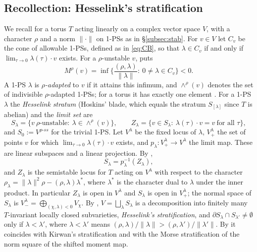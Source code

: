 \documentclass[11pt]{amsart}
\theoremstyle{definition}
\theoremstyle{remark}
\numberwithin{equation}{section}
\newcommand{\norm}[1]{\lVert #1\rVert}
\begin{document}
\subsection{Recollection: Hesselink's stratification}\label{subsec:HKKN}
We recall \cite[\S\S2.2--2.3]{Hos} for a torus $T$ acting linearly on a complex vector space $V$, with a
character $\rho$ and a norm $\norm{\cdot}$ on 1-PSs as in \S\ref{subsec:stab}. For $v\in V$ let $C_v$ be
the cone of allowable 1-PSs, defined as in \eqref{eq:CB}, so that $\lambda\in C_v$ if and only if
$\lim_{\tau\to0}\lambda(\tau)\cdot v$ exists. For a $\rho$-unstable $v$, \cite[Definition~2.12]{Hos}
puts
\[
  M^\rho(v)=\inf\Big\{\frac{(\rho,\lambda)}{\norm{\lambda}}:\ 0\neq\lambda\in C_v\Big\}<0 .
\]
A 1-PS $\lambda$ is \emph{$\rho$-adapted} to $v$ if it attains this infimum, and $\wedge^\rho(v)$ denotes
the set of indivisible $\rho$-adapted 1-PSs; for a torus it has exactly one element
\cite[Lemma~2.13]{Hos}. For a 1-PS $\lambda$ the \emph{Hesselink stratum} (Hoskins' blade, which equals the
stratum $S_{[\lambda]}$ since $T$ is abelian) and the \emph{limit set} are \cite[(5), (6)]{Hos}
\[
  S_\lambda=\{v\ \rho\text{-unstable}:\ \lambda\in\wedge^\rho(v)\},\qquad
  Z_\lambda=\{v\in S_\lambda:\ \lambda(\tau)\cdot v=v\ \text{for all }\tau\},
\]
and $S_0:=V^{\rho\text{-}ss}$ for the trivial 1-PS. Let $V^\lambda$ be the fixed locus of $\lambda$,
$V^\lambda_+$ the set of points $v$ for which $\lim_{\tau\to0}\lambda(\tau)\cdot v$ exists, and
$p_\lambda:V^\lambda_+\to V^\lambda$ the limit map. These are linear subspaces and a linear projection.
By \cite[Proposition~2.18, Lemma~2.19]{Hos},
\[
  S_\lambda=p_\lambda^{-1}(Z_\lambda),
\]
and $Z_\lambda$ is the semistable locus for $T$ acting on $V^\lambda$ with respect to the character
$\rho_\lambda=\norm{\lambda}^2\rho-(\rho,\lambda)\lambda^*$, where $\lambda^*$ is the character dual to
$\lambda$ under the inner product. In particular $Z_\lambda$ is open in $V^\lambda$ and $S_\lambda$ is open
in $V^\lambda_+$; the normal space of $S_\lambda$ is $V^\lambda_-=\bigoplus_{(\chi,\lambda)<0}V_\chi$. By
\cite[Theorem~2.16, Remark~2.17]{Hos}, $V=\bigsqcup_\lambda S_\lambda$ is a decomposition into finitely
many $T$-invariant locally closed subvarieties, \emph{Hesselink's stratification}, and
$\partial S_\lambda\cap S_{\lambda'}\neq\emptyset$ only if $\lambda<\lambda'$, where
$\lambda<\lambda'$ means $(\rho,\lambda)/\norm{\lambda}>(\rho,\lambda')/\norm{\lambda'}$. By
\cite[Theorems~4.12 and~4.18]{Hos} it coincides with Kirwan's stratification and with the Morse
stratification of the norm square of the shifted moment map.
\end{document}
